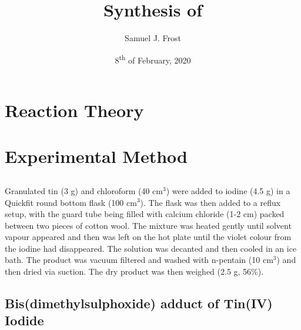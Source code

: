 \documentclass{article}
\title{Synthesis of \ce{SnI_4}}
\author{Samuel J. Frost}
\date{8\textsuperscript{th} of February, 2020}
\begin{document}
\maketitle

\section{Reaction Theory}

\section{Experimental Method}
\subsection{}
Granulated tin (3 g) and chloroform (40 cm$^3$) were added to iodine (4.5 g) in a 
Quickfit round bottom flask (100 cm$^3$).
The flask was then added to a reflux setup, with the guard tube being filled with calcium chloride (1-2 cm)
packed between two pieces of cotton wool.
The mixture was heated gently until solvent vapour appeared and then was left on the hot plate until
the violet colour from the iodine had disappeared.
The solution was decanted and then cooled in an ice bath.
The product was vacuum filtered and washed with n-pentain (10 cm$^3$) and then dried via suction. 
The dry product was then weighed (2.5 g, 56\%).

\subsection{Bis(dimethylsulphoxide) adduct of Tin(IV) Iodide}
\end{document}
